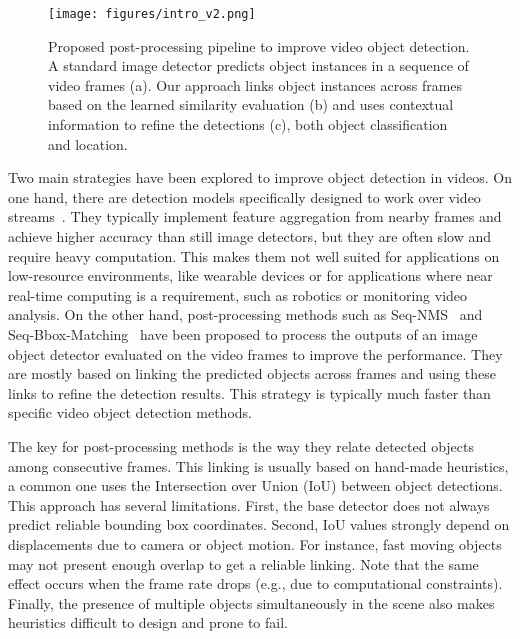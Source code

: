 \documentclass[letterpaper, 10 pt, conference]{ieeeconf}
\begin{document}
\begin{figure}[!tb]
\centering
\texttt{[image: figures/intro\_v2.png]}
\caption{Proposed post-processing pipeline to improve video object detection. A standard image detector predicts object instances in a sequence of video frames
(a). Our approach  links object instances across frames based on the learned similarity evaluation (b) and uses contextual information to refine the detections (c), both object classification and location.}
\label{fig:intro}
\end{figure}

Two main strategies have been explored to improve object detection in videos. On one hand, there are detection models specifically designed to work over video streams~\cite{Zhu_2017_ICCV, wu2019selsa}. They typically implement feature aggregation from nearby frames and achieve higher accuracy than still image detectors, but they are often slow and require heavy computation.  This makes them not well suited for applications on low-resource environments, like wearable devices or for applications where near real-time computing is a requirement, such as robotics or monitoring video analysis. 
On the other hand, post-processing methods such as Seq-NMS~\cite{SEQ-NMS} and Seq-Bbox-Matching~\cite{SEQ-BBOX:VISIGRAPP} have been proposed to process the outputs of an image object detector evaluated on the video frames to improve the performance. They are mostly based on linking the predicted objects across frames and using these links to refine the detection results. This strategy is typically much faster than specific video object detection methods.  





The key for post-processing methods is the way they relate detected objects among consecutive frames. 
This linking is usually based on hand-made heuristics, a common one uses the Intersection over Union (IoU) between object detections. 
This approach has several limitations. 
First, the base detector does not always predict reliable bounding box coordinates. Second, IoU values strongly depend on displacements due to camera or object motion. For instance, fast moving objects may not present enough overlap to get a reliable linking. Note that the same effect occurs when the frame rate drops (e.g., due to computational constraints). Finally, the presence of multiple objects simultaneously in the scene also makes heuristics difficult to design and prone to fail.
\end{document}
